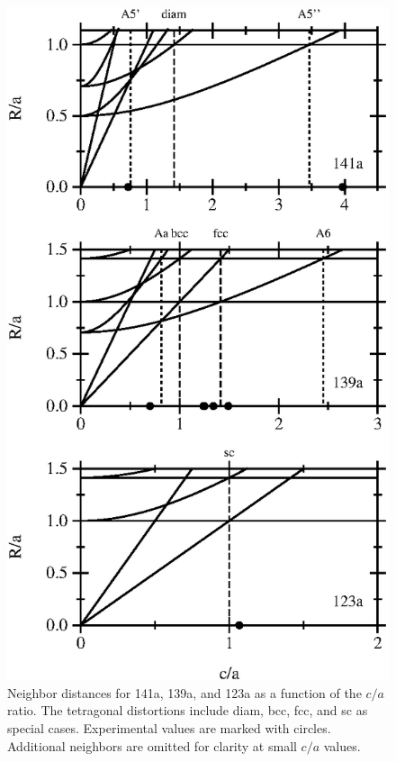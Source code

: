 \documentclass[preprint]{iucr}              %
\begin{document}
\begin{figure}
\begin{center}
\includegraphics{tetrEPS.eps}
\end{center}
\caption[Neighbor distances for 141a, 139a, and 123a]{Neighbor
distances for 141a, 139a, and 123a as a function of the $c/a$ ratio.
The tetragonal distortions include diam, bcc, fcc, and sc as special
cases.  Experimental values are marked with circles.  Additional
neighbors are omitted for clarity at small $c/a$ values.}
\label{fig:tetr}
\end{figure}
\end{document}
